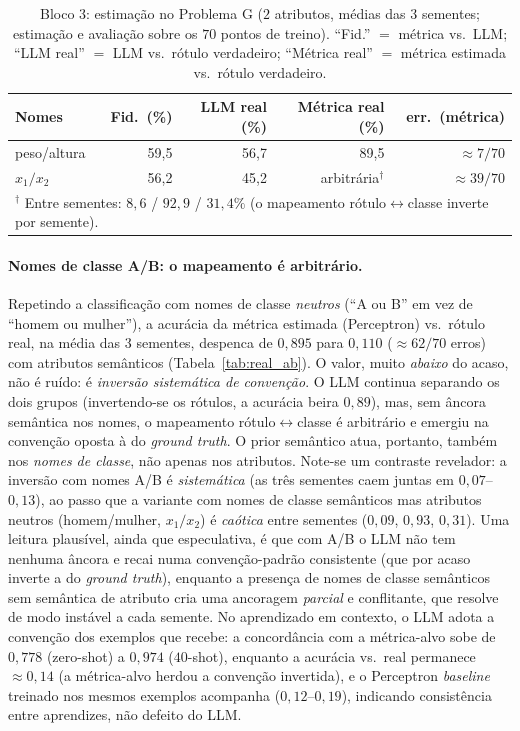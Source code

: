 \documentclass[12pt,a4paper]{article}
\begin{document}
\begin{table}[ht]
\centering
\caption{Bloco 3: estimação no Problema G ($2$ atributos, médias das $3$ sementes;
estimação e avaliação sobre os $70$ pontos de treino).
``Fid.'' $=$ métrica vs.\ LLM; ``LLM real'' $=$ LLM vs.\ rótulo verdadeiro; ``Métrica real''
$=$ métrica estimada vs.\ rótulo verdadeiro.}
\label{tab:real_a}
\begin{tabular}{lrrrr}
\toprule
\textbf{Nomes} & \textbf{Fid.\ (\%)} & \textbf{LLM real (\%)} &
\textbf{Métrica real (\%)} & \textbf{err.\ (métrica)} \\
\midrule
peso/altura & 59,5 & 56,7 & 89,5 & $\approx 7/70$ \\
$x_1/x_2$   & 56,2 & 45,2 & arbitrária$^\dagger$ & $\approx 39/70$ \\
\bottomrule
\multicolumn{5}{l}{\footnotesize $^\dagger$ Entre sementes: $8{,}6$ / $92{,}9$ / $31{,}4\%$
(o mapeamento rótulo$\leftrightarrow$classe inverte por semente).}
\end{tabular}
\end{table}

\paragraph{Nomes de classe A/B: o mapeamento é arbitrário.}
Repetindo a classificação com nomes de classe \emph{neutros} (``A ou B'' em vez de
``homem ou mulher''), a acurácia da métrica estimada (Perceptron) vs.\ rótulo real, na
média das $3$ sementes, despenca de $0{,}895$ para $0{,}110$ ($\approx 62/70$ erros) com
atributos semânticos (Tabela~\ref{tab:real_ab}). O valor, muito \emph{abaixo} do
acaso, não é ruído: é \emph{inversão sistemática de convenção}. O LLM continua separando
os dois grupos (invertendo-se os rótulos, a acurácia beira $0{,}89$), mas, sem âncora
semântica nos nomes, o mapeamento rótulo$\leftrightarrow$classe é arbitrário e emergiu na
convenção oposta à do \emph{ground truth}. O prior semântico atua, portanto, também nos
\emph{nomes de classe}, não apenas nos atributos. Note-se um contraste revelador: a
inversão com nomes A/B é \emph{sistemática} (as três sementes caem juntas em $0{,}07$–$0{,}13$),
ao passo que a variante com nomes de classe semânticos mas atributos neutros
(homem/mulher, $x_1/x_2$) é \emph{caótica} entre sementes ($0{,}09$, $0{,}93$, $0{,}31$).
Uma leitura plausível, ainda que especulativa, é que com A/B o LLM não tem nenhuma âncora e
recai numa convenção-padrão consistente (que por acaso inverte a do \emph{ground truth}),
enquanto a presença de nomes de classe semânticos sem semântica de atributo cria uma
ancoragem \emph{parcial} e conflitante, que resolve de modo instável a cada semente. No
aprendizado em contexto,
o LLM adota a convenção dos
exemplos que recebe: a concordância com a métrica-alvo sobe de $0{,}778$ (zero-shot) a
$0{,}974$ ($40$-shot), enquanto a acurácia vs.\ real permanece $\approx 0{,}14$ (a
métrica-alvo herdou a convenção invertida), e o Perceptron \emph{baseline} treinado nos
mesmos exemplos acompanha ($0{,}12$–$0{,}19$), indicando consistência entre aprendizes, não
defeito do LLM.
\end{document}
